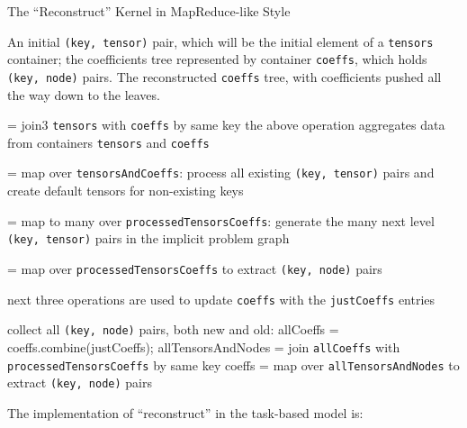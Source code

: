 \documentclass{article}
\begin{document}
\begin{algorithm}[H]
\caption{The ``Reconstruct'' Kernel in MapReduce-like Style}
\label{alg:ReconstructMapReduce}
\begin{algorithmic}[1]

\REQUIRE An initial {\tt (key, tensor)} pair, which will be the initial element
of a {\tt tensors} container; the coefficients tree represented by container {\tt coeffs}, 
which holds {\tt (key, node)} pairs.
\ENSURE The reconstructed {\tt coeffs} tree, with coefficients pushed all
the way down to the leaves.

       = join3 {\tt tensors} with {\tt coeffs} by same key
      \STATE \COMMENT the above operation aggregates data from containers {\tt tensors} and {\tt coeffs}
      
       = map over {\tt tensorsAndCoeffs}: process all existing 
             {\tt (key, tensor)} pairs and create default tensors for non-existing keys

       = map to many over {\tt processedTensorsCoeffs}: generate
             the many next level {\tt (key, tensor)} pairs in the implicit problem graph
 
       = map over {\tt processedTensorsCoeffs} to extract {\tt (key, node)} pairs
            
      \STATE \COMMENT next three operations are used to update {\tt coeffs} with the {\tt justCoeffs} entries

      \STATE \COMMENT collect all {\tt (key, node)} pairs, both new and old:
      \STATE   allCoeffs = coeffs.combine(justCoeffs);
      \STATE allTensorsAndNodes = join {\tt allCoeffs} with {\tt processedTensorsCoeffs} by same key 
      \STATE coeffs = map over {\tt allTensorsAndNodes} to extract {\tt (key, node)} pairs
\ENDWHILE

\end{algorithmic}
\end{algorithm}

The implementation of ``reconstruct'' in the task-based model is:
\end{document}
